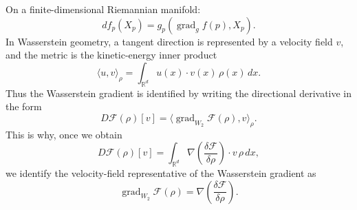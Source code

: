 \documentclass[11pt]{article}
\begin{document}
On a finite-dimensional Riemannian manifold:
\[
df_p(X_p)
=
g_p(\operatorname{grad}_g f(p),X_p).
\]
In Wasserstein geometry, a tangent direction is represented by a velocity field
$v$, and the metric is the kinetic-energy inner product
\[
\langle u,v\rangle_\rho
=
\int_{\mathbb R^d}u(x)\cdot v(x)\,\rho(x)\,dx.
\]
Thus the Wasserstein gradient is identified by writing the directional
derivative in the form
\[
D\mathcal F(\rho)[v]
=
\langle \operatorname{grad}_{W_2}\mathcal F(\rho),v\rangle_\rho.
\]
This is why, once we obtain
\[
D\mathcal F(\rho)[v]
=
\int_{\mathbb R^d}
\nabla\left(\frac{\delta\mathcal F}{\delta\rho}\right)
\cdot v\,\rho\,dx,
\]
we identify the velocity-field representative of the Wasserstein gradient as
\[
\operatorname{grad}_{W_2}\mathcal F(\rho)
=
\nabla\left(\frac{\delta\mathcal F}{\delta\rho}\right).
\]
\end{document}
